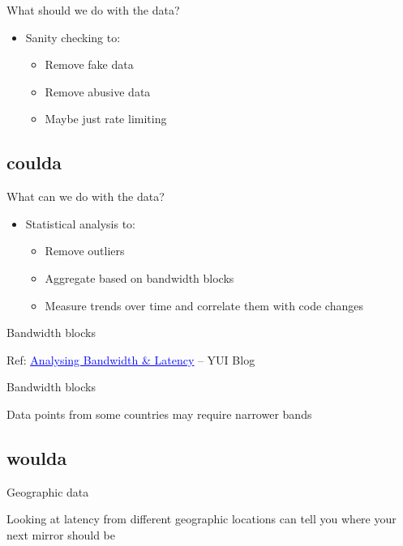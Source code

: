 \documentclass{beamer}
\begin{document}
\begin{frame}{What should we do with the data?}
  \begin{itemize}
  \item Sanity checking to:
    \begin{itemize}
    \item Remove fake data
    \item Remove abusive data
    \item Maybe just rate limiting
    \end{itemize}
  \end{itemize}
\end{frame}

\subsection{coulda}
\begin{frame}{What can we do with the data?}
  \begin{itemize}
  \item Statistical analysis to:
    \begin{itemize}
    \item Remove outliers
    \item Aggregate based on bandwidth blocks
    \item Measure trends over time and correlate them with code changes
    \end{itemize}
  \end{itemize}
\end{frame}

\begin{frame}{Bandwidth blocks}
  \parbox[c][\paperheight]{\paperwidth}{ }
  \hfill \tiny{Ref: \href{http://www.yuiblog.com/blog/2010/04/08/analyzing-bandwidth-and-latency/}{\textcolor{blue}{\underline{Analysing Bandwidth \& Latency}}} -- YUI Blog}
\end{frame}


\begin{frame}{Bandwidth blocks}
  \begin{center}
  Data points from some countries may require narrower bands
  \end{center}
\end{frame}

\subsection{woulda}
\begin{frame}{Geographic data}
  \begin{center}
  Looking at latency from different geographic locations can tell you where your next mirror should be
  \end{center}
\end{frame}
\end{document}
